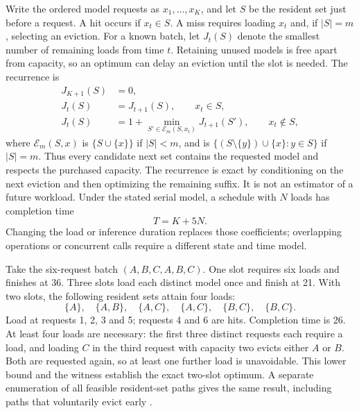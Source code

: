 Write the ordered model requests as $x_1,\ldots,x_K$, and let $S$ be the
resident set just before a request. A hit occurs if $x_t\in S$. A miss requires
loading $x_t$ and, if $|S|=m$, selecting an eviction. For a known batch, let
$J_t(S)$ denote the smallest number of remaining loads from time $t$. Retaining
unused models is free apart from capacity, so an optimum can delay an eviction
until the slot is needed. The recurrence is
\begin{equation}
\begin{split}
 J_{K+1}(S)&=0,\\
 J_t(S)&=J_{t+1}(S),\qquad x_t\in S,\\
 J_t(S)&=1+\min_{S'\in\mathcal E_m(S,x_t)}J_{t+1}(S'),\qquad x_t\notin S,
\end{split}
\label{exec17:s8-resident-bellman}
\end{equation}
where $\mathcal E_m(S,x)$ is $\{S\cup\{x\}\}$ if $|S|<m$, and is
$\{(S\setminus\{y\})\cup\{x\}:y\in S\}$ if $|S|=m$.
Thus every candidate next set contains the requested model and respects the
purchased capacity. The recurrence is exact by conditioning on the next
eviction and then optimizing the remaining suffix. It is not an estimator of
a future workload. Under the stated serial model, a schedule with $N$ loads
has completion time
\begin{equation}
 T=K+5N.
 \label{exec17:s8-resident-time}
\end{equation}
Changing the load or inference duration replaces those coefficients; overlapping
operations or concurrent calls require a different state and time model.

Take the six-request batch $(A,B,C,A,B,C)$. One slot requires six loads and
finishes at 36. Three slots load each distinct model once and finish at 21.
With two slots, the following resident sets attain four loads:
\begin{equation}
 \{A\},\quad\{A,B\},\quad\{A,C\},\quad\{A,C\},\quad\{B,C\},\quad\{B,C\}.
 \label{exec17:s8-resident-witness}
\end{equation}
Load at requests 1, 2, 3 and 5; requests 4 and 6 are hits. Completion time is
26. At least four loads are necessary: the first three distinct requests each
require a load, and loading $C$ in the third request with capacity two evicts
either $A$ or $B$. Both are requested again, so at least one further load is
unavoidable. This lower bound and the witness establish the exact two-slot
optimum. A separate enumeration of all feasible resident-set paths gives the
same result, including paths that voluntarily evict early
\citep{exec17_s8_residency}.

